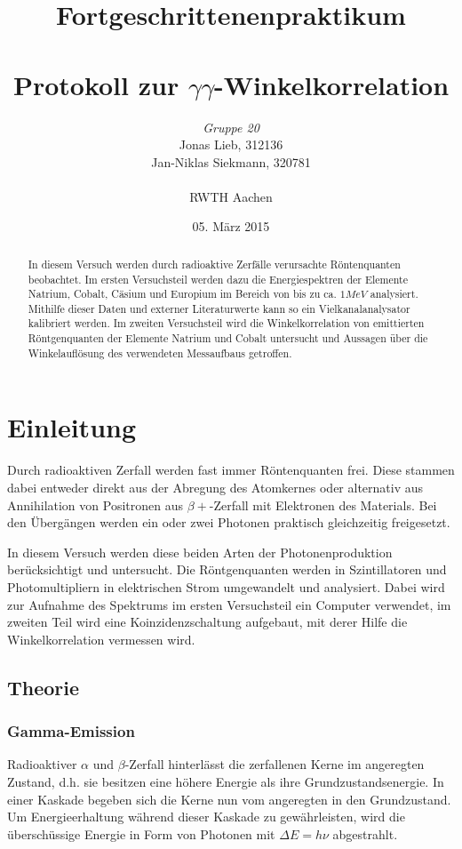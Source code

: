 \documentclass{../Misc/MontavonLaTeX/Montavon}
\date{05. März 2015}
\begin{document}
\title{Fortgeschrittenenpraktikum \\ \quad \\ Protokoll zur $\gamma\gamma$-Winkelkorrelation }
\author{\emph{Gruppe 20} \\  Jonas Lieb, 312136 \\ Jan-Niklas Siekmann, 320781 \\ \ \\  RWTH Aachen}
\maketitle
\begin{abstract}
In diesem Versuch werden durch radioaktive Zerfälle verursachte Röntenquanten beobachtet. Im ersten Versuchsteil werden dazu die Energiespektren der Elemente Natrium, Cobalt, Cäsium und Europium im Bereich von bis zu ca. $1 \unit{MeV}$ analysiert. Mithilfe dieser Daten und externer Literaturwerte kann so ein Vielkanalanalysator kalibriert werden.
Im zweiten Versuchsteil wird die Winkelkorrelation von emittierten Röntgenquanten der Elemente Natrium und Cobalt untersucht und Aussagen über die Winkelauflösung des verwendeten Messaufbaus getroffen.
\end{abstract}
\newpage

\tableofcontents
\newpage

\section{Einleitung}

Durch radioaktiven Zerfall werden fast immer Röntenquanten frei. Diese stammen dabei entweder direkt aus der Abregung des Atomkernes oder alternativ aus Annihilation von Positronen aus $\beta+$-Zerfall mit Elektronen des Materials. Bei den Übergängen werden ein oder zwei Photonen praktisch gleichzeitig freigesetzt. 

In diesem Versuch werden diese beiden Arten der Photonenproduktion berücksichtigt und untersucht.
Die Röntgenquanten werden in Szintillatoren und Photomultipliern in elektrischen Strom umgewandelt und analysiert. Dabei wird zur Aufnahme des Spektrums im ersten Versuchsteil ein Computer verwendet, im zweiten Teil wird eine Koinzidenzschaltung aufgebaut, mit derer Hilfe die Winkelkorrelation vermessen wird.

\subsection{Theorie}
\subsubsection{Gamma-Emission}
Radioaktiver $\alpha$ und $\beta$-Zerfall hinterlässt die zerfallenen Kerne im angeregten Zustand, d.h. sie besitzen eine höhere Energie als ihre Grundzustandsenergie. In einer Kaskade begeben sich die Kerne nun vom angeregten in den Grundzustand. Um Energieerhaltung während dieser Kaskade zu gewährleisten, wird die überschüssige Energie in Form von Photonen mit $\Delta E = h \nu$ abgestrahlt.
\end{document}
